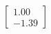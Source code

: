 \documentclass[preview]{standalone}
\begin{document}
\begin{align*}
\begin{bmatrix} 1.00 \\ -1.39 \end{bmatrix}
\end{align*}
\end{document}
